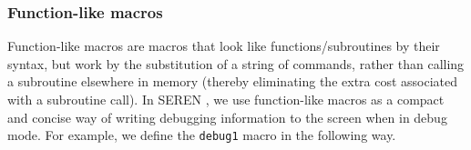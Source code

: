 \documentclass[a4paper]{article}
\newcommand{\NAME}{SEREN }
\newcommand{\var}[1]{\texttt{#1}}
\begin{document}



\subsubsection{Function-like macros}
Function-like macros are macros that look like functions/subroutines by their syntax, but work by the substitution of a string of commands, rather than calling a subroutine elsewhere in memory (thereby eliminating the extra cost associated with a subroutine call).  In \NAME, we use function-like macros as a compact and concise way of writing debugging information to the screen when in debug mode.  For example, we define the \var{debug1} macro in the following way. \newline
\end{document}
